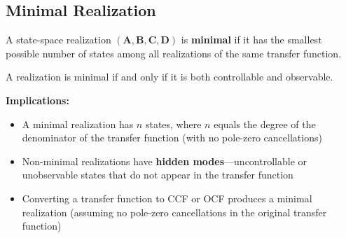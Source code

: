 \subsection{Minimal Realization}

\begin{definition}
A state-space realization $(\mathbf{A}, \mathbf{B}, \mathbf{C}, \mathbf{D})$ is \textbf{minimal} if it has the smallest possible number of states among all realizations of the same transfer function.
\end{definition}

\begin{theorem}
A realization is minimal if and only if it is both controllable and observable.
\end{theorem}

\textbf{Implications:}
\begin{itemize}
    \item A minimal realization has $n$ states, where $n$ equals the degree of the denominator of the transfer function (with no pole-zero cancellations)
    \item Non-minimal realizations have \textbf{hidden modes}---uncontrollable or unobservable states that do not appear in the transfer function
    \item Converting a transfer function to CCF or OCF produces a minimal realization (assuming no pole-zero cancellations in the original transfer function)
\end{itemize}

